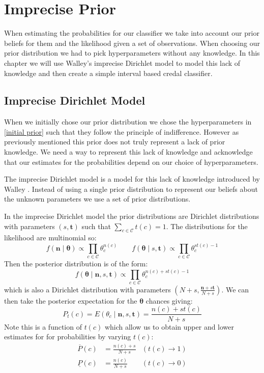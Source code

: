 \newcommand{\sn}[2]{\ensuremath{{#1}\times 10^{#2}}}

\chapter{Imprecise Prior}

When estimating the probabilities for our classifier we take into account our prior beliefs for them and the likelihood given a set of observations.
When choosing our prior distribution we had to pick hyperparameters without any knowledge.
In this chapter we will use Walley's imprecise Dirichlet model \cite{Walley96} to model this lack of knowledge and then create a simple interval based credal classifier.

\section{Imprecise Dirichlet Model}

When we initially chose our prior distribution we chose the hyperparameters in \cref{initial prior} such that they follow the principle of indifference.
However as previously mentioned this prior does not truly represent a lack of prior knowledge.
We need a way to represent this lack of knowledge and acknowledge that our estimates for the probabilities depend on our choice of hyperparameters.

The imprecise Dirichlet model is a model for this lack of knowledge introduced by Walley \cite{Walley96}.
Instead of using a single prior distribution to represent our beliefs about the unknown parameters we use a set of prior distributions.

In the imprecise Dirichlet model the prior distributions are Dirichlet distributions with parameters $(s, \mathbf{t})$ such that $\sum_{c \in \mathcal{C}} t(c) = 1$.
The distributions for the likelihood are multinomial so:
\begin{equation}
	f(\mathbf{n} \mid \bm{\theta}) \propto \prod_{c \in \mathcal{C}} \theta_c^{n(c)}
	\qquad
	f(\bm{\theta} \mid s, \mathbf{t}) \propto \prod_{c \in \mathcal{C}} \theta_c^{st(c) - 1}
\end{equation}
Then the posterior distribution is of the form:
\begin{equation} \label{dirichlet_pdf2}
	f(\mathbf{\theta} \mid \mathbf{n}, s, \mathbf{t}) \propto \prod_{c \in \mathcal{C}} \theta_c^{n(c) + st(c) - 1}
\end{equation}
which is also a Dirichlet distribution with parameters $(N+s, \frac{\mathbf{n}+s\mathbf{t}}{N+s})$.
We can then take the posterior expectation for the $\bm{\theta}$ chances giving:
\begin{equation}
	P_t(c) = E(\theta_c \mid \mathbf{n}, s, \mathbf{t}) = \frac{n(c)+st(c)}{N+s}
\end{equation}
Note this is a function of $t(c)$ which allow us to obtain upper and lower estimates for for probabilities by varying $t(c)$:
\begin{align}
	\overline{P}(c) & = \frac{n(c)+s}{N+s} & (t(c) \rightarrow 1) \\
	\underline{P}(c) & = \frac{n(c)}{N+s}  & (t(c) \rightarrow 0)
\end{align}

